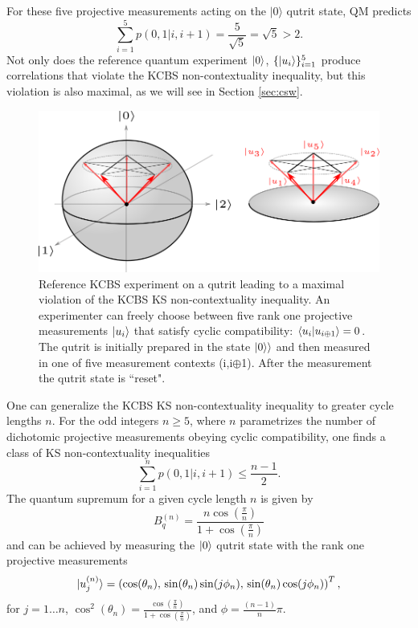 For these five projective measurements acting on the $\vert 0\rangle$ qutrit state, QM predicts \begin{equation*}
\sum_{i=1}^5p(0,1\vert i, i+1)=\frac{5}{\sqrt{5}}=\sqrt{5}>2.    
\end{equation*}
Not only does the reference quantum experiment $\ket{0}$, $\{\ket{u_i}\}_{i=1}^5$ produce correlations that violate the KCBS non-contextuality inequality, but this violation is also maximal, as we will see in Section \ref{sec:csw}.

\begin{figure}
    \centering
    \includegraphics[width=\textwidth]{images/kcbsref.png}
    \caption{Reference KCBS experiment on a qutrit leading to a maximal violation of the KCBS KS non-contextuality inequality. An experimenter can freely choose between five rank one projective measurements $\ket{u_i}$ that satisfy cyclic compatibility: $\bra{u_i}\ket{ u_{i\oplus1}} = 0$. The qutrit is initially prepared in the state $\ket{0\rangle}$ and then measured in one of five measurement contexts (i,i$\oplus$1). After the measurement the qutrit state is ``reset".}
    \label{fig:kcbsref}
\end{figure}

One can generalize the KCBS KS non-contextuality inequality to greater cycle lengths $n$. For the odd integers $n\geq 5$, where $n$ parametrizes the number of dichotomic projective measurements obeying cyclic compatibility, one finds a class of KS non-contextuality inequalities \cite{Bharti2019}
\begin{equation}
    \label{eqn:oddncycleclass}
    \sum_{i=1}^n p(0,1\vert i,i+1) \leq \frac{n-1}{2}.
\end{equation}
The quantum supremum for a given cycle length $n$ is given by 
\begin{equation}
\label{eqn:ncyclequsup}
B_q^{(n)}=\frac{n\cos(\frac{\pi}{n})}{1+\cos(\frac{\pi}{n})}
\end{equation} and can be achieved by measuring the $\ket{0}$ qutrit state with the rank one projective measurements
\begin{equation}
\label{eqn:ncycleideal}
\vert u_j^{(n)}\rangle = \left(\cos(\theta_n),\thinspace\sin(\theta_n)\sin(j\phi_n),\thinspace\sin(\theta_n)\cos(j\phi_n)\right)^T,
\end{equation}
for $j=1\dots n$, $\displaystyle\cos^2(\theta_n)=\frac{\cos(\frac{\pi}{n})}{1+\cos(\frac{\pi}{n})}$, and $\displaystyle\phi=\frac{(n-1)}{n}\pi$.

